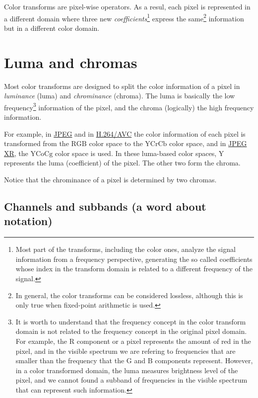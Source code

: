 Color transforms are pixel-wise operators. As a resul, each pixel is
represented in a different domain where three new
\emph{coefficients}\footnote{Most part of the transforms, including
the color ones, analyze the signal information from a frequency
perspective, generating the so called coefficients whose index in the
transform domain is related to a different frequency of the signal.}
express the same\footnote{In general, the color transforms can be
considered lossless, although this is only true when fixed-point
arithmetic is used.} information but in a different color domain.

\section{Luma and chromas}

Most color transforms are designed to split the color information of a
pixel in \emph{luminance} (luma) and \emph{chrominance} (chroma). The
luma is basically the low frequency\footnote{It is worth to understand
  that the frequency concept in the color transform domain is not
  related to the frequency concept in the original pixel domain. For
  example, the $\text{R}$ component or a pixel represents the amount
  of red in the pixel, and in the visible spectrum we are refering to
  frequencies that are smaller than the frequency that the $\text{G}$
  and $\text{B}$ components represent. However, in a color transformed
  domain, the luma measures brightness level of the pixel, and we
  cannot found a subband of frequencies in the visible spectrum that
  can represent such information.} information of the pixel, and the
chroma (logically) the high frequency information.

For example, in
\href{https://en.wikipedia.org/wiki/JPEG#JPEG_codec_example}{JPEG} and
in
\href{https://en.wikipedia.org/wiki/Advanced_Video_Coding#Fidelity_range_extensions_and_professional_profiles}{H.264/AVC}
the color information of each pixel is transformed from the
$\text{RGB}$ color space to the $\text{YCrCb}$ color space, and in
\href{https://en.wikipedia.org/wiki/JPEG_XR#Description}{JPEG XR}, the
$\text{YCoCg}$ color space is used. In these luma-based color spaces,
$\text{Y}$ represents the luma (coefficient) of the pixel. The other
two form the chroma.

Notice that the chrominance of a pixel is determined by two chromas.

\subsection*{Channels and subbands (a word about notation)}

